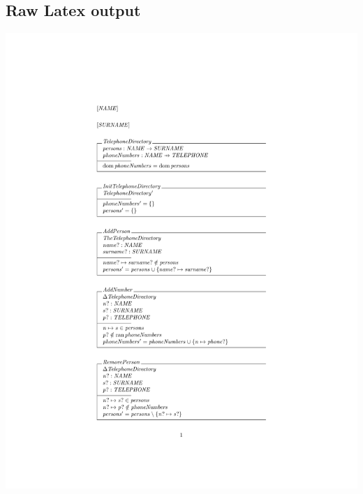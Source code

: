 




\subsection{Raw Latex output}

\noindent \includegraphics[clip, trim=4cm 8cm 4cm 4.2cm]{examples/nonworkzcga/0.pdf}

